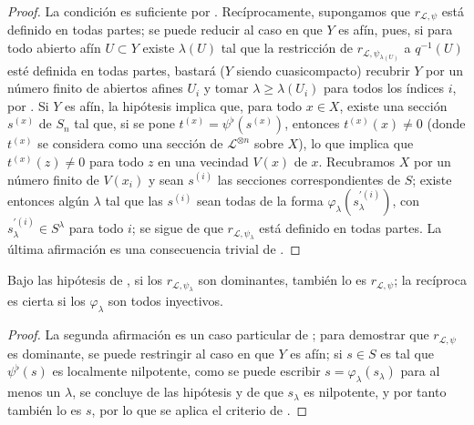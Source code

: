 \documentclass[oneside,10pt]{amsart}
\renewcommand{\geq}{\geqslant}
\newcommand{\oldpage}[2][]{\marginnote{\normalfont\footnotesize\textbf{#1}~|~#2}\ignorespaces}
\let\EGAOriginalLabel\label
\renewcommand{\label}[1]{\phantomsection\EGAOriginalLabel{#1}}
\begin{document}
\begin{proof}
La condición es suficiente por .
Recíprocamente, supongamos que $r_{\mathcal{L},\psi}$ está definido en todas partes;
se puede reducir al caso en que $Y$ es afín, pues, si para todo abierto afín $U\subset Y$ existe $\lambda(U)$ tal que la restricción de $r_{\mathcal{L},\psi_{\lambda(U)}}$ a $q^{-1}(U)$ esté definida en todas partes, bastará ($Y$ siendo cuasicompacto) recubrir $Y$ por un número finito de abiertos afines $U_i$ y tomar $\lambda\geq\lambda(U_i)$ para todos los índices $i$, por .
Si $Y$ es afín, la hipótesis implica que, para todo $x\in X$, existe una sección $s^{(x)}$ de $S_n$ tal que, si se pone $t^{(x)}=\psi^\flat(s^{(x)})$, entonces $t^{(x)}(x)\neq0$ (donde $t^{(x)}$ se considera como una sección de $\mathcal{L}^{\otimes n}$ sobre $X$), lo que implica que $t^{(x)}(z)\neq0$ para todo $z$ en una vecindad $V(x)$ de $x$.
Recubramos $X$ por un número finito de $V(x_i)$ y sean $s^{(i)}$ las secciones correspondientes de $S$;
existe entonces algún $\lambda$ tal que las $s^{(i)}$ sean todas de la forma $\varphi_\lambda(s_\lambda^{\prime(i)})$, con $s_\lambda^{\prime(i)}\in S^\lambda$ para todo $i$;
se sigue de  que $r_{\mathcal{L},\psi_\lambda}$ está definido en todas partes.
La última afirmación es una consecuencia trivial de .
\end{proof}

\begin{corollary}[3.7.8]
\label{II.3.7.8-fr}
Bajo las hipótesis de , si los $r_{\mathcal{L},\psi_\lambda}$ son dominantes, también lo es $r_{\mathcal{L},\psi}$;
la recíproca es cierta si los $\varphi_\lambda$ son todos inyectivos.
\end{corollary}

\oldpage[II]{68}
\begin{proof}
La segunda afirmación es un caso particular de ;
para demostrar que $r_{\mathcal{L},\psi}$ es dominante, se puede restringir al caso en que $Y$ es afín;
si $s\in S$ es tal que $\psi^\flat(s)$ es localmente nilpotente, como se puede escribir $s=\varphi_\lambda(s_\lambda)$ para al menos un $\lambda$, se concluye de las hipótesis y de  que $s_\lambda$ es nilpotente, y por tanto también lo es $s$, por lo que se aplica el criterio de .
\end{proof}
\end{document}

